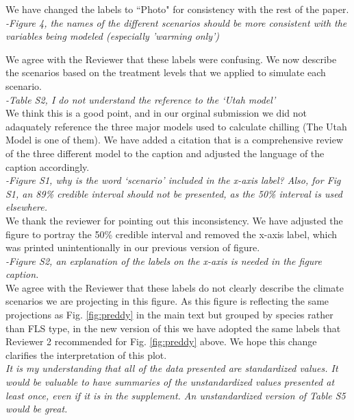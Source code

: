 \documentclass[11pt]{article}
\begin{document}
\noindent We have changed the labels to ``Photo" for consistency with the rest of the paper.\\

\emph{-Figure 4, the names of the different scenarios should be more consistent with the variables being modeled (especially 'warming only')}

\noindent We agree with the Reviewer that these labels were confusing. We now describe the scenarios based on the treatment levels that we applied to simulate each scenario.\\

\emph{-Table S2, I do not understand the reference to the `Utah model'}\\

\noindent We think this is a good point, and in our orginal submission we did not adaquately reference the three major models used to calculate chilling (The Utah Model is one of them). We have added a citation that is a comprehensive review of the three different model to the caption and adjusted the language of the caption accordingly.\\

\emph{-Figure S1, why is the word `scenario' included in the x-axis label? Also, for Fig S1, an 89\% credible interval should not be presented, as the 50\% interval is used elsewhere.}\\

\noident We thank the reviewer for pointing out this inconsistency. We have adjusted the figure to portray the 50\% credible interval and removed the x-axis label, which was printed unintentionally in our previous version of figure.\\

\emph{-Figure S2, an explanation of the labels on the x-axis is needed in the figure caption.}\\

\noindent We agree with the Reviewer that these labels do not clearly describe the climate scenarios we are projecting in this figure. As this figure is reflecting the same projections as Fig. \ref{fig:preddy} in the main text but grouped by species rather than FLS type, in the new version of this we have adopted the same labels that Reviewer 2 recommended for Fig. \ref{fig:preddy} above. We hope this change clarifies the interpretation of this plot.\\


\emph{It is my understanding that all of the data presented are standardized values. It would be valuable to have summaries of the unstandardized values presented at least once, even if it is in the supplement. An unstandardized version of Table S5 would be great.}\\
\end{document}
